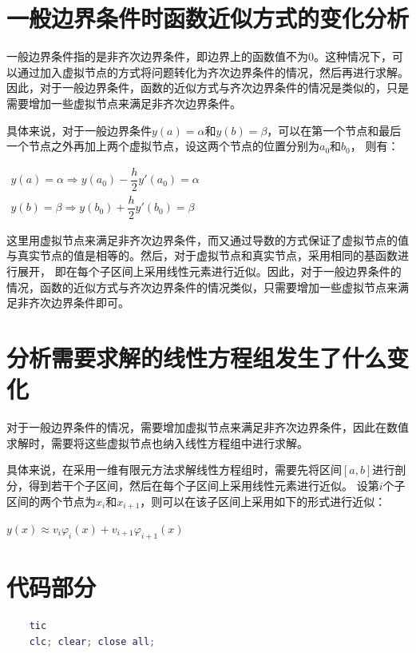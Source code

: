 \documentclass[12pt, a4paper, oneside]{ctexart}
\begin{document}
\begin{spacing}{2.0}
\section{一般边界条件时函数近似方式的变化分析}
一般边界条件指的是非齐次边界条件，即边界上的函数值不为0。这种情况下，可以通过加入虚拟节点的方式将问题转化为齐次边界条件的情况，然后再进行求解。
因此，对于一般边界条件，函数的近似方式与齐次边界条件的情况是类似的，只是需要增加一些虚拟节点来满足非齐次边界条件。

具体来说，对于一般边界条件$y(a)=\alpha$和$y(b)=\beta$，可以在第一个节点和最后一个节点之外再加上两个虚拟节点，设这两个节点的位置分别为$a_0$和$b_0$，
则有：
\begin{center}
    $\begin{array}{c}y(a)=\alpha\Rightarrow y(a_0)-\dfrac{h}{2}y'(a_0)=\alpha\\ 
    y(b)=\beta\Rightarrow y(b_0)+\dfrac{h}{2}y'(b_0)=\beta\end{array}$
\end{center}
这里用虚拟节点来满足非齐次边界条件，而又通过导数的方式保证了虚拟节点的值与真实节点的值是相等的。然后，对于虚拟节点和真实节点，采用相同的基函数进行展开，
即在每个子区间上采用线性元素进行近似。因此，对于一般边界条件的情况，函数的近似方式与齐次边界条件的情况类似，只需要增加一些虚拟节点来满足非齐次边界条件即可。

\section{分析需要求解的线性方程组发生了什么变化}
对于一般边界条件的情况，需要增加虚拟节点来满足非齐次边界条件，因此在数值求解时，需要将这些虚拟节点也纳入线性方程组中进行求解。

具体来说，在采用一维有限元方法求解线性方程组时，需要先将区间$[a,b]$进行剖分，得到若干个子区间，然后在每个子区间上采用线性元素进行近似。
设第$i$个子区间的两个节点为$x_i$和$x_{i+1}$，则可以在该子区间上采用如下的形式进行近似：

\begin{center}
    $y(x)\approx v_i\varphi_i(x)+v_{i+1}\varphi_{i+1}(x)\quad\text{}$
\end{center}

\section{代码部分}
\begin{lstlisting}[language=MATLAB, caption=有限元]
    % 一维有限元方法求解常微分方程边值问题
    tic
    clc; clear; close all;
    

\end{lstlisting}
\end{spacing}
\end{document}
